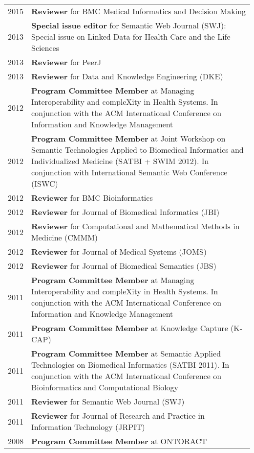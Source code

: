 \documentclass[11pt,fullpage]{article}
\begin{document}
\begin{longtable}{p{0.5in}|p{5.5in}}

2015  & \textbf{Reviewer} for BMC Medical Informatics and Decision Making \\
2013 & {\bf Special issue editor} for Semantic Web Journal (SWJ): Special issue on Linked Data for Health Care and the Life Sciences \\
2013  & \textbf{Reviewer} for PeerJ \\
2013  & \textbf{Reviewer} for Data and Knowledge Engineering (DKE) \\

2012 & \textbf{Program Committee Member} at Managing Interoperability and compleXity in Health Systems. In conjunction with the ACM International Conference on Information and Knowledge Management\\
2012 & \textbf{Program Committee Member} at Joint Workshop on Semantic Technologies Applied to Biomedical Informatics and Individualized Medicine (SATBI + SWIM 2012). In conjunction with International Semantic Web Conference (ISWC)\\
2012  & \textbf{Reviewer} for BMC Bioinformatics \\
2012  & \textbf{Reviewer} for Journal of Biomedical Informatics (JBI) \\
2012  & \textbf{Reviewer} for Computational and Mathematical Methods in Medicine (CMMM) \\
2012  & \textbf{Reviewer} for Journal of Medical Systems (JOMS) \\
2012  & \textbf{Reviewer} for Journal of Biomedical Semantics (JBS) \\
2011 & \textbf{Program Committee Member} at Managing Interoperability and compleXity in Health Systems. In conjunction with the ACM International Conference on Information and Knowledge Management\\
2011 & \textbf{Program Committee Member} at Knowledge Capture (K-CAP)\\
2011 & \textbf{Program Committee Member} at Semantic Applied Technologies on Biomedical Informatics (SATBI 2011). In conjunction with the ACM International Conference on Bioinformatics and Computational Biology\\
2011  & \textbf{Reviewer} for Semantic Web Journal (SWJ) \\
2011  & \textbf{Reviewer} for Journal of Research and Practice in Information Technology (JRPIT)\\
2008 & \textbf{Program Committee Member} at ONTORACT \\

\end{longtable}
\end{document}
